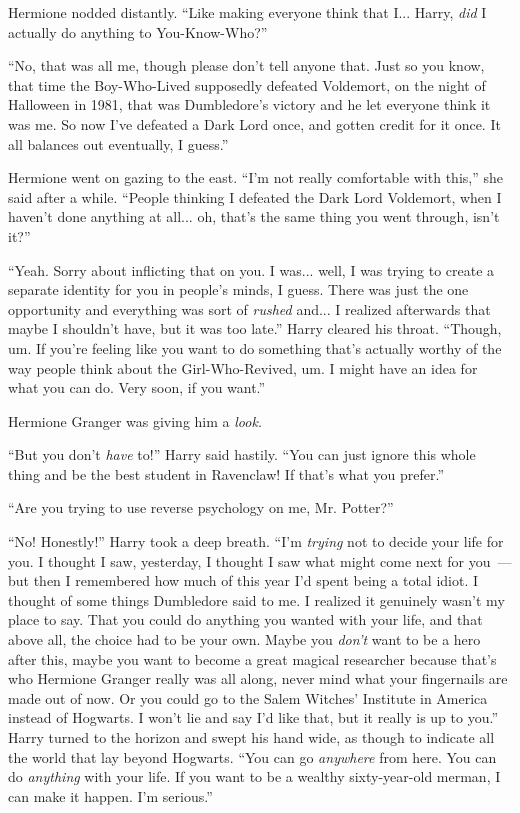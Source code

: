 Hermione nodded distantly. ``Like making everyone think that I... Harry, \emph{did} I actually do anything to You-Know-Who?''

``No, that was all me, though please don't tell anyone that. Just so you know, that time the Boy-Who-Lived supposedly defeated Voldemort, on the night of Halloween in 1981, that was Dumbledore's victory and he let everyone think it was me. So now I've defeated a Dark Lord once, and gotten credit for it once. It all balances out eventually, I guess.''

Hermione went on gazing to the east. ``I'm not really comfortable with this,'' she said after a while. ``People thinking I defeated the Dark Lord Voldemort, when I haven't done anything at all... oh, that's the same thing you went through, isn't it?''

``Yeah. Sorry about inflicting that on you. I was... well, I was trying to create a separate identity for you in people's minds, I guess. There was just the one opportunity and everything was sort of \emph{rushed} and... I realized afterwards that maybe I shouldn't have, but it was too late.'' Harry cleared his throat. ``Though, um. If you're feeling like you want to do something that's actually worthy of the way people think about the Girl-Who-Revived, um. I might have an idea for what you can do. Very soon, if you want.''

Hermione Granger was giving him a \emph{look.}

``But you don't \emph{have} to!'' Harry said hastily. ``You can just ignore this whole thing and be the best student in Ravenclaw! If that's what you prefer.''

``Are you trying to use reverse psychology on me, Mr. Potter?''

``No! Honestly!'' Harry took a deep breath. ``I'm \emph{trying} not to decide your life for you. I thought I saw, yesterday, I thought I saw what might come next for you~--- but then I remembered how much of this year I'd spent being a total idiot. I thought of some things Dumbledore said to me. I realized it genuinely wasn't my place to say. That you could do anything you wanted with your life, and that above all, the choice had to be your own. Maybe you \emph{don't} want to be a hero after this, maybe you want to become a great magical researcher because that's who Hermione Granger really was all along, never mind what your fingernails are made out of now. Or you could go to the Salem Witches' Institute in America instead of Hogwarts. I won't lie and say I'd like that, but it really is up to you.'' Harry turned to the horizon and swept his hand wide, as though to indicate all the world that lay beyond Hogwarts. ``You can go \emph{anywhere} from here. You can do \emph{anything} with your life. If you want to be a wealthy sixty-year-old merman, I can make it happen. I'm serious.''

